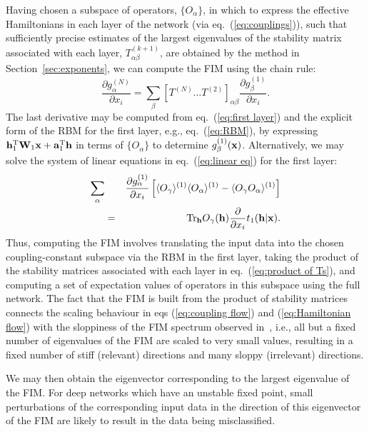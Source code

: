 \documentclass[reprint,amsmath,amssymb,aps]{revtex4-1}
\begin{document}
Having chosen a subspace of operators, $\{O_\alpha\}$, in which to express the effective Hamiltonians in each layer of the network (via eq.~(\ref{eq:couplings})), such that sufficiently precise estimates of the largest eigenvalues of the stability matrix associated with each layer, $T^{(k+1)}_{\alpha\beta}$, are obtained by the method in Section~\ref{sec:exponents}, we can compute the FIM using the chain rule:
\begin{equation}
\frac{\partial g^{(N)}_\alpha}{\partial x_i} = \sum_\beta{\left[ T^{(N)} \ldots T^{(2)} \right]_{\alpha\beta} \frac{\partial g^{(1)}_\beta}{\partial x_i}}.
\label{eq:product of Ts}
\end{equation}
The last derivative may be computed from eq.~(\ref{eq:first layer}) and the explicit form of the RBM for the first layer, e.g., eq.~(\ref{eq:RBM}), by expressing ${\bf h}_1^{\rm T} {\bf W}_1 {\bf x} + {\bf a}_1^{\rm T} {\bf h}$ in terms of $\{O_\alpha\}$ to determine $g^{(1)}_\beta ({\bf x})$. Alternatively, we may solve the system of linear equations in eq.~(\ref{eq:linear eq}) for the first layer:
\begin{eqnarray}
\sum_\alpha&&{\frac{\partial g^{(1)}_\alpha}{\partial x_i}\left[\langle O_\gamma\rangle^{(1)}\langle O_\alpha\rangle^{(1)} - \langle O_\gamma O_\alpha\rangle^{(1)}\right]} \nonumber\\
&=& {\rm Tr}_{\bf h} O_\gamma({\bf h}) \frac{\partial}{\partial x_i} t_1({\bf h}|{\bf x}).
\label{eq:linear eq for first layer}
\end{eqnarray}
Thus, computing the FIM involves translating the input data into the chosen coupling-constant subspace via the RBM in the first layer, taking the product of the stability matrices associated with each layer in eq.~(\ref{eq:product of Ts}), and computing a set of expectation values of operators in this subspace using the full network. The fact that the FIM is built from the product of stability matrices connects the scaling behaviour in eqs (\ref{eq:coupling flow}) and (\ref{eq:Hamiltonian flow}) with the sloppiness of the FIM spectrum observed in~\cite{MachtaChachraTranstrumSethna2013}, i.e., all but a fixed number of eigenvalues of the FIM are scaled to very small values, resulting in a fixed number of stiff (relevant) directions and many sloppy (irrelevant) directions. 

We may then obtain the eigenvector corresponding to the largest eigenvalue of the FIM. For deep networks which have an unstable fixed point, small perturbations of the corresponding input data in the direction of this eigenvector of the FIM are likely to result in the data being misclassified.
\end{document}

